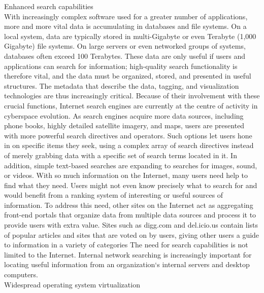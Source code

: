 \documentclass[11pt,a4paper]{article}
\begin{document}
Enhanced search capabilities \\

	With increasingly complex software used for a
greater number of applications, more and more vital data is accumulating in databases and file systems. On a local system, data are typically stored in multi-Gigabyte or even Terabyte (1,000 Gigabyte) file systems. On large servers or even networked groups of systems, databases often exceed 100 Terabytes. These data are
only useful if users and applications can search for information; high-quality search functionality is therefore vital, and the data must be organized, stored,
and presented in useful structures. The metadata that describe the data, tagging, and visualization technologies are thus increasingly critical. Because of
their involvement with these crucial functions, Internet search engines are currently at the centre of activity in cyberspace evolution. As search engines acquire more data sources, including phone books, highly detailed
satellite imagery, and maps, users are presented with more powerful search directives and operators. Such options let users hone in on specific
items they seek, using a complex array of search directives instead of merely grabbing data with a specific set of search terms located in it. In addition,
simple text-based searches are expanding to searches for images, sound, or videos. With so much information on the Internet, many users need help to find what they
need. Users might not even know precisely what to search for and would benefit from a ranking system of interesting or useful sources of information. To address
this need, other sites on the Internet act as aggregating front-end portals that organize data from multiple data sources and process it to provide users with extra value. Sites such as digg.com and del.icio.us contain lists of
popular articles and sites that are voted on by users, giving other users a guide to information in a variety of categories The need for search capabilities is not limited to the Internet. Internal network searching is increasingly important for locating useful information from an organization‘s internal servers and desktop
computers.\\

Widespread operating system virtualization\\
\end{document}
